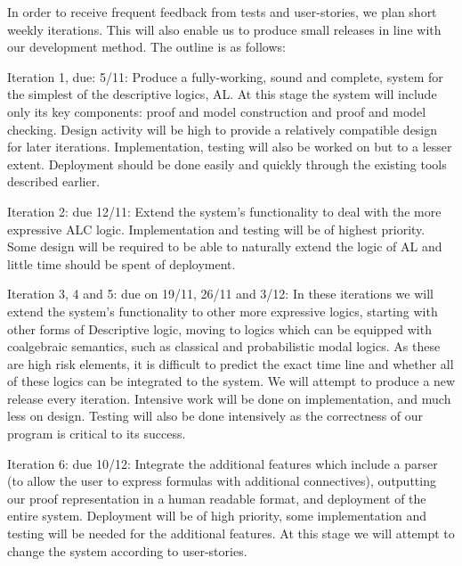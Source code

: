 In order to receive frequent feedback from tests and user-stories, we plan short weekly iterations. This will also enable us to produce small releases in line with our development method. The outline is as follows:

Iteration 1, due: 5/11: Produce a fully-working, sound and complete, system for the simplest of the descriptive logics, AL. At this stage the system will include only its key components: proof and model construction and proof and model checking.  Design activity will be high to provide a relatively compatible design for later iterations. Implementation, testing will also be worked on but to a lesser extent. Deployment should be done easily and quickly through the existing tools described earlier. 

Iteration 2: due 12/11: Extend the system's functionality to deal with the more expressive ALC logic. Implementation and testing will be of highest priority. Some design will be required to be able to naturally extend the logic of AL and little time should be spent of deployment.

Iteration 3, 4 and 5: due on 19/11, 26/11 and 3/12: In these iterations we will extend the system's functionality to other more expressive logics, starting with other forms of Descriptive logic, moving to logics which can be equipped with coalgebraic semantics, such as classical and probabilistic modal logics. As these are high risk elements, it is difficult to predict the exact time line and whether all of these logics can be integrated to the system. We will attempt to produce a new release every iteration. Intensive work will be done on implementation, and much less on design. Testing will also be done intensively as the correctness of our program is critical to its success.

Iteration 6: due 10/12: Integrate the additional features which include a parser (to allow the user to express formulas with additional connectives), outputting our proof representation in a human readable format, and deployment of the entire system. Deployment will be of high priority, some implementation and testing will be needed for the additional features. At this stage we will attempt to change the system according to user-stories. 
